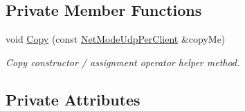 \subsection*{Private Member Functions}
\begin{DoxyCompactItemize}
\item 
void \hyperlink{class_net_mode_udp_per_client_aba1429095bd80cb401f15c9400b119bd}{Copy} (const \hyperlink{class_net_mode_udp_per_client}{NetModeUdpPerClient} \&copyMe)
\begin{DoxyCompactList}\small\item\em Copy constructor / assignment operator helper method. \item\end{DoxyCompactList}\end{DoxyCompactItemize}
\subsection*{Private Attributes}
